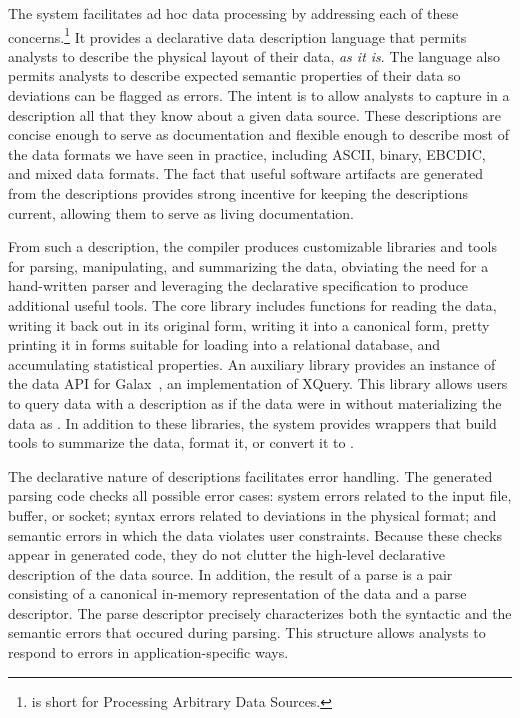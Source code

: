 \documentclass{sig-alternate}
\begin{document}
The \pads{} system facilitates ad hoc data processing by addressing
each of these concerns.\footnote{
  \pads{} is short for Processing Arbitrary Data Sources.
}%
It provides a declarative data description
language that permits analysts to describe the physical layout of
their data, \textit{as it is}.  The language also permits analysts to
describe expected semantic properties of their data so deviations can
be flagged as errors. The intent is to allow analysts to capture in a
\pads{} description all that they know about a given data source.
These descriptions are concise enough to
serve as documentation and flexible enough to describe most of
the data formats we have seen in practice, including ASCII, binary,
EBCDIC, and mixed data formats.  The fact that useful software
artifacts are generated from the descriptions provides strong
incentive for keeping the descriptions current, allowing them to serve
as living documentation.  

From such a description, the \pads{} compiler produces customizable \C{} libraries
and tools for parsing, manipulating, and summarizing the data,
obviating the need for a hand-written parser and leveraging the
declarative specification to produce additional useful tools. 
The core \C{} library includes functions for reading the data, writing it 
back out in its original form, writing it into a canonical \xml{} form, pretty printing
it in forms suitable for loading into a relational database, and accumulating  
statistical properties.  An auxiliary library provides 
an instance of the data API for Galax~\cite{galax,galaxmanual}, an implementation of XQuery.  This 
library allows users to query data with a \pads{} description as if the data were
in \xml{} without materializing the data as \xml{}.  In addition to these libraries,
the \pads{} system provides wrappers that build tools to 
summarize the data, format it,  or convert it to \xml{}.

The declarative nature of \pads{} descriptions facilitates error handling.
The generated parsing code checks all possible error cases: system
errors related to the input file, buffer, or socket; syntax errors
related to deviations in the physical format; and semantic errors in
which the data violates user constraints.  Because these checks appear
in generated code, they do not clutter the high-level declarative
description of the data source.
In addition, the result of a parse is a pair consisting of a canonical in-memory
representation of the data and a parse descriptor. The parse
descriptor precisely characterizes both the syntactic and the semantic
errors that occured during parsing.  This structure allows analysts
to respond to errors in application-specific ways.  
\end{document}
